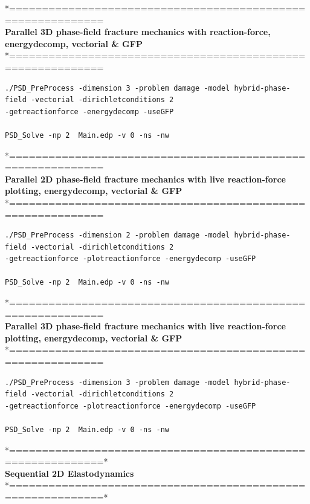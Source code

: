 *============================================================\\
\textbf{ Parallel 3D phase-field fracture mechanics with reaction-force, energydecomp, vectorial \& GFP} \\
*============================================================\\
\begin{lstlisting}[style=Linux]
./PSD_PreProcess -dimension 3 -problem damage -model hybrid-phase-field -vectorial -dirichletconditions 2 
-getreactionforce -energydecomp -useGFP   

PSD_Solve -np 2  Main.edp -v 0 -ns -nw   	
\end{lstlisting}
*============================================================\\
 \textbf{Parallel 2D phase-field fracture mechanics with live reaction-force plotting, energydecomp, vectorial \& GFP} \\
*============================================================\\
\begin{lstlisting}[style=Linux]
./PSD_PreProcess -dimension 2 -problem damage -model hybrid-phase-field -vectorial -dirichletconditions 2 
-getreactionforce -plotreactionforce -energydecomp -useGFP  

PSD_Solve -np 2  Main.edp -v 0 -ns -nw   
\end{lstlisting}
*============================================================\\
\textbf{ Parallel 3D phase-field fracture mechanics with live reaction-force plotting, energydecomp, vectorial \& GFP} \\
*============================================================\\
\begin{lstlisting}[style=Linux]
./PSD_PreProcess -dimension 3 -problem damage -model hybrid-phase-field -vectorial -dirichletconditions 2 
-getreactionforce -plotreactionforce -energydecomp -useGFP   

PSD_Solve -np 2  Main.edp -v 0 -ns -nw   	
\end{lstlisting}


*============================================================*\\
\textbf{ Sequential 2D Elastodynamics}  \\                    
*============================================================*\\

